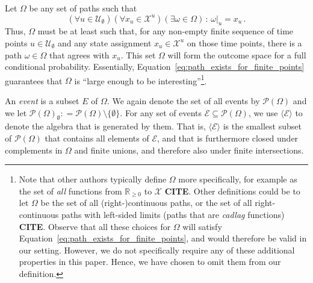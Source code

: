 \documentclass[10pt,a4paper]{paper}
\theoremstyle{definition}
\newcommand{\reals}{\mathbb{R}}
\newcommand{\realsnonneg}{\reals_{\geq 0}}
\newcommand{\states}{\mathcal{X}}
\newcommand{\paths}{\Omega}
\newcommand{\power}{\mathcal{P}(\paths)}
\newcommand{\nonemptypower}{\power_{\emptyset}}
\newcommand{\coloneqq}{:\!=}
\begin{document}
Let $\paths$ be any set of paths such that
\begin{equation}\label{eq:path_exists_for_finite_points}
(\forall u\in\mathcal{U}_\emptyset)(\forall x_u\in\states^u)(\exists \omega\in\Omega)\,:\,\omega\vert_u=x_u\,.
\end{equation}
Thus, $\Omega$ must be at least such that, for any non-empty finite sequence of time points $u\in\mathcal{U}_\emptyset$ and any state assignment $x_u\in\states^u$ on those time points, there is a path $\omega\in\Omega$ that agrees with $x_u$. This set $\Omega$ will form the outcome space for a full conditional probability. Essentially, Equation~\eqref{eq:path_exists_for_finite_points} guarantees that $\Omega$ is ``large enough to be interesting''\footnote{Note that other authors typically define $\Omega$ more specifically, for example as the set of \emph{all} functions from $\realsnonneg$ to $\states$ {\bf CITE}. Other definitions could be to let $\Omega$ be the set of all (right-)continuous paths, or the set of all right-continuous paths with left-sided limits (paths that are \emph{cadlag} functions) {\bf CITE}. Observe that all these choices for $\Omega$ will satisfy Equation~\eqref{eq:path_exists_for_finite_points}, and would therefore be valid in our setting. However, we do not specifically require any of these additional properties in this paper. Hence, we have chosen to omit them from our definition.}.

An \emph{event} is a subset $E$ of $\paths$. We again denote the set of all events by $\power$ and we let $\nonemptypower\coloneqq\power\setminus\{\emptyset\}$. For any set of events $\mathcal{E}\subseteq\power$, we use $\langle\mathcal{E}\rangle$ to denote the algebra that is generated by them. That is, $\langle\mathcal{E}\rangle$ is the smallest subset of $\power$ that contains all elements of $\mathcal{E}$, and that is furthermore closed under complements in $\Omega$ and finite unions, and therefore also under finite intersections. 
\end{document}
